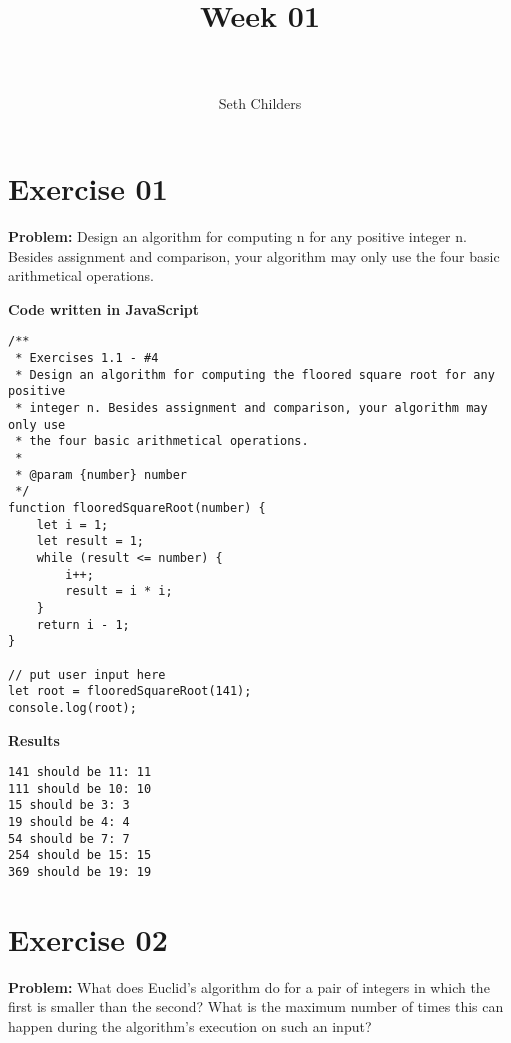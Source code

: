 \documentclass[paper=a4, fontsize=11pt]{scrartcl} %
\title{	
\normalfont \normalsize 
\horrule{0.5pt} \\[0.4cm] %
\huge Week 01 \\ %
\horrule{2pt} \\[0.5cm] %
}
\author{Seth Childers} %
\date{} %
\numberwithin{equation}{section} %
\numberwithin{figure}{section} %
\numberwithin{table}{section} %
\begin{document}
\maketitle %


\section{Exercise 01}

\textbf{Problem:} Design an algorithm for computing n for any positive integer n. Besides assignment and comparison, your algorithm may only use the four basic arithmetical operations.

\bigskip
\textbf{Code written in JavaScript}
\begin{lstlisting}
/**
 * Exercises 1.1 - #4
 * Design an algorithm for computing the floored square root for any positive 
 * integer n. Besides assignment and comparison, your algorithm may only use
 * the four basic arithmetical operations.
 * 
 * @param {number} number 
 */
function flooredSquareRoot(number) {
    let i = 1;
    let result = 1;
    while (result <= number) {
        i++;
        result = i * i;
    }
    return i - 1;
}

// put user input here
let root = flooredSquareRoot(141);
console.log(root);
\end{lstlisting}

\bigskip
\textbf{Results}
\begin{lstlisting}
141 should be 11: 11
111 should be 10: 10
15 should be 3: 3
19 should be 4: 4
54 should be 7: 7
254 should be 15: 15
369 should be 19: 19
\end{lstlisting}


\section{Exercise 02}

\textbf{Problem:} What does Euclid’s algorithm do for a pair of integers in which the first is smaller than the second? What is the maximum number of times this can happen during the algorithm’s execution on such an input?
\end{document}
